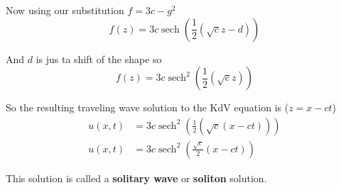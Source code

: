 \documentclass[12pt, letterpaper]{article}
\DeclareMathOperator{\sech}{sech}
\begin{document}
    Now using our substitution $f = 3c-g^2$
    \[
      f(z) = 3c \sech \left( \frac{1}{2} (\sqrt{c}z-d) \right)
    \]

    And $d$ is jus ta shift of the shape so
    \[
        f(z) = 3c \sech^2 \left( \frac{1}{2} (\sqrt{c}z) \right)
    \]

    So the resulting traveling wave solution to the KdV equation is ($z=x-ct$)
    \begin{align*}
        u(x,t) &= 3c \sech^2 \left( \frac{1}{2} (\sqrt{c}(x-ct)) \right)\\
        u(x,t) &= 3c \sech^2 \left( \frac{\sqrt{c}}{2} (x-ct) \right)
    \end{align*}

    This solution is called a \textbf{solitary wave} or \textbf{soliton} solution.
\end{document}
